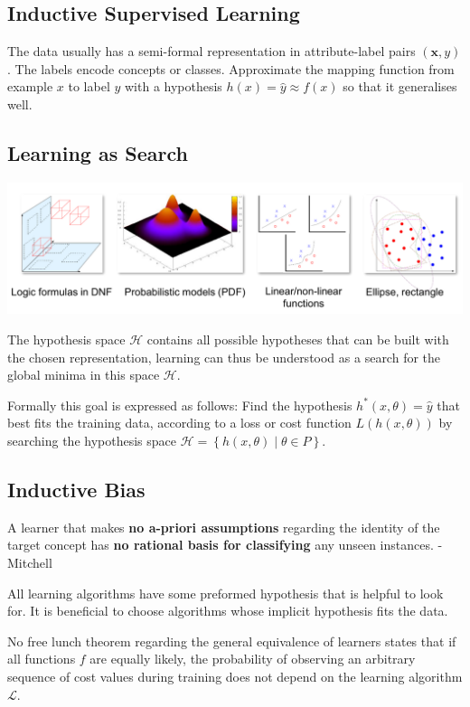 \documentclass[11pt]{article}
\theoremstyle{definition}
\newcommand*\Hilbert{\ensuremath{\mathcal{H}}}
\begin{document}
\subsection{Inductive Supervised Learning}
The data usually has a semi-formal representation in attribute-label pairs $(\textbf{x}, y)$. The labels encode concepts or classes.
Approximate the mapping function from example $x$ to label $y$ with a hypothesis $h(x) = \hat{y} \approx f(x)$ so that it generalises well.

\subsection{Learning as Search}
\begin{center}
	\includegraphics[width=0.7\linewidth]{img/hypothesis_space}
\end{center}

The hypothesis space $\Hilbert$ contains all possible hypotheses that can be built with the chosen representation, learning can thus be understood as a search for the global minima in this space \Hilbert.

\noindent
Formally this goal is expressed as follows: Find the hypothesis $h^* (x,\theta) = \hat{y}$ that best fits the training data, according to a loss or cost function $L(h(x,\theta))$ by searching the hypothesis space $\Hilbert = \left\{ h(x,\theta) \middle| \theta \in P\right\}$.

\subsection{Inductive Bias}
\begin{theorem}
	A learner that makes \textbf{no a-priori assumptions} regarding the identity of the target concept has \textbf{no rational basis for classifying} any unseen instances. - Mitchell
\end{theorem}
All learning algorithms have some preformed hypothesis that is helpful to look for. It is beneficial to choose algorithms whose implicit hypothesis fits the data.

No free lunch theorem regarding the general equivalence of learners states that if all functions $f$ are equally likely, the probability of observing an arbitrary sequence of cost values during training does not depend on the learning algorithm $\mathcal{L}$.
\end{document}
